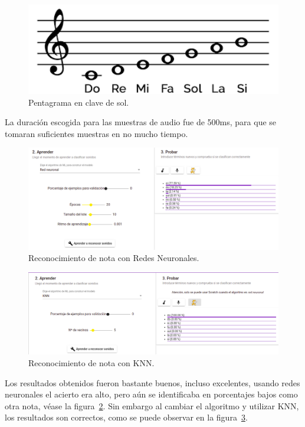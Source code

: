 \documentclass[a4paper, 12pt]{book}
\begin{document}
\begin{figure}
	\centering
	\includegraphics[width=12cm,keepaspectratio]{img/pentagrama.png}
	\caption{Pentagrama en clave de sol.}\label{fig:pentagrama}
\end{figure}

La duración escogida para las muestras de audio fue de 500ms, para que se tomaran suficientes muestras en no mucho tiempo.

\begin{figure}
	\centering
	\includegraphics[width=14cm]{img/nn1.png}
	\caption{Reconocimiento de nota con Redes Neuronales.}\label{fig:neural-networks}
\end{figure}

\begin{figure}
	\centering
	\includegraphics[width=14cm]{img/knn1.png}
	\caption{Reconocimiento de nota con KNN.}\label{fig:knn}
\end{figure}

Los resultados obtenidos fueron bastante buenos, incluso excelentes, usando redes neuronales el acierto era alto, pero aún se identificaba en porcentajes bajos como otra nota, véase la figura~\ref{fig:neural-networks}. Sin embargo al cambiar el algoritmo y utilizar KNN, los resultados son correctos, como se puede observar en la figura~\ref{fig:knn}.
\end{document}
